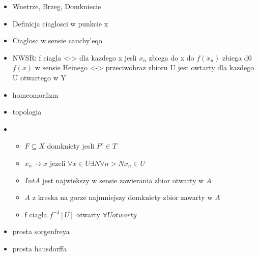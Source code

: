 \documentclass{article}
\begin{document}
\begin{itemize}

\item Wnetrze, Brzeg, Domkniecie
\item Definicja ciaglosci w punkcie x
\item Ciaglosc w sensie cauchy'eqo
\item NWSR: f ciagla <-> dla kazdego x jesli $x_{n}$ zbiega do x do $f(x_{n})$ zbiega d0 $f(x)$ w sensie Heinego <-> przeciwobraz zbioru U jest owtarty dla kazdego U otwartego w Y
\item homeomorfizm
\item topologia
\item
    \begin{itemize}
        upgrade z przestrzeni metrycznej do topologicznej $(X,T)$
    \item $F \subseteq X$ domkniety jesli $F^{c} \in T$
    \item $x_n \rightarrow x$ jezeli $\forall x \in U \exists N \forall n > N x_{n} \in U$
    \item $IntA$ jest najwiekszy w sensie zawierania zbior otwarty w $A$
    \item $A$ z kreska na gorze najmniejszy domkniety zbior zawarty w $A$ 
    \item f ciagla $f^{-1}[U]$ otwarty $\forall U otwarty$
    \end{itemize}
\item prosta sorgenfreya
\item prosta hausdorffa

\end{itemize}
\end{document}
